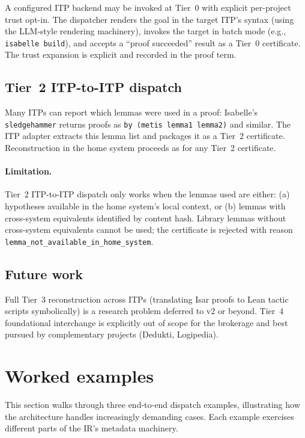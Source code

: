 \documentclass[11pt,letterpaper]{article}
\theoremstyle{definition}
\theoremstyle{remark}
\begin{document}
A configured ITP backend may be invoked at Tier~0 with explicit per-project
trust opt-in. The dispatcher renders the goal in the target ITP's
syntax (using the LLM-style rendering machinery), invokes the target
in batch mode (e.g., \texttt{isabelle build}), and accepts a
``proof succeeded'' result as a Tier~0 certificate. The trust expansion
is explicit and recorded in the proof term.

\subsection{Tier~2 ITP-to-ITP dispatch}

Many ITPs can report which lemmas were used in a proof: Isabelle's
\texttt{sledgehammer} returns proofs as \texttt{by (metis lemma1
lemma2)} and similar. The ITP adapter extracts this lemma list and
packages it as a Tier~2 certificate. Reconstruction in the home system
proceeds as for any Tier~2 certificate.

\paragraph{Limitation.} Tier~2 ITP-to-ITP dispatch only works when the
lemmas used are either: (a) hypotheses available in the home system's
local context, or (b) lemmas with cross-system equivalents identified
by content hash. Library lemmas without cross-system equivalents
cannot be used; the certificate is rejected with reason
\texttt{lemma\_not\_available\_in\_home\_system}.

\subsection{Future work}

Full Tier~3 reconstruction across ITPs (translating Isar proofs to
Lean tactic scripts symbolically) is a research problem deferred to
v2 or beyond. Tier~4 foundational interchange is explicitly
out of scope for the brokerage and best pursued by complementary
projects (Dedukti, Logipedia).

\section{Worked examples}
\label{sec:examples}

This section walks through three end-to-end dispatch examples,
illustrating how the architecture handles increasingly demanding
cases. Each example exercises different parts of the IR's metadata
machinery.
\end{document}
